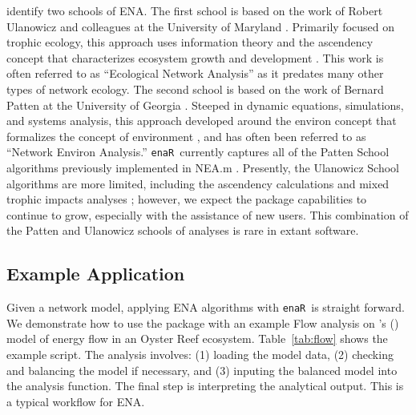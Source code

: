 \documentclass[11pt]{article}
\def\citeapos#1{\citeauthor{#1}'s (\citeyear{#1})}
\newcommand{\enaR}{\texttt{enaR}}
\begin{document}
\begin{spacing}{2}
\citet{scharler09comparing} identify two schools of ENA.  The first
school is based on the work of Robert Ulanowicz and colleagues at the
University of Maryland \citep{ulanowicz86, ulanowicz97,
  ulanowicz09_window}.  Primarily focused on trophic ecology, this
approach uses information theory and the ascendency concept that
characterizes ecosystem growth and development \citet{ulanowicz86,
  ulanowicz97}.  This work is often referred to as ``Ecological
Network Analysis'' as it predates many other types of network ecology.
The second school is based on the work of Bernard Patten at the
University of Georgia \citep{patten76, matis81, patten82,
  fath99_review}.  Steeped in dynamic equations, simulations, and
systems analysis, this approach developed around the environ concept
that formalizes the concept of environment \citep{patten78}, and has
often been referred to as ``Network Environ Analysis.''
\enaR\ currently captures all of the Patten School algorithms
previously implemented in NEA.m \citep{fath06}.  Presently, the
Ulanowicz School algorithms are more limited, including the ascendency
calculations \citep{ulanowicz97} and mixed trophic impacts analyses
\citep{ulanowicz90}; however, we expect the package capabilities to
continue to grow, especially with the assistance of new users.  This
combination of the Patten and Ulanowicz schools of analyses is rare in
extant software.

\subsection{Example Application}
Given a network model, applying ENA algorithms with \enaR\ is straight
forward. We demonstrate how to use the package with an example Flow
analysis on \citeapos{dame81} model of energy flow in an Oyster Reef
ecosystem. Table~\ref{tab:flow} shows the example script.  The
analysis involves: (1) loading the model data, (2) checking and
balancing the model if necessary, and (3) inputing the balanced model
into the analysis function.  The final step is interpreting the
analytical output. This is a typical workflow for ENA.


\end{spacing}
\end{document}
